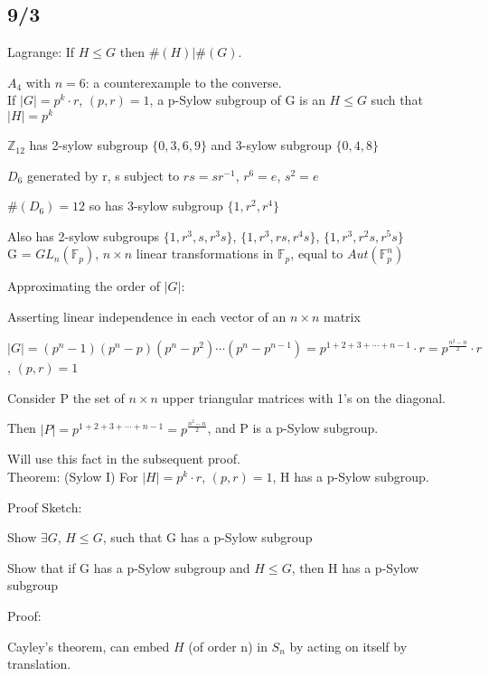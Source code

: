 \documentclass[12pt]{article}
\begin{document}
\subsection{9/3}

\noindent
Lagrange: If $H \leq G$ then $\#(H)|\#(G)$.

$A_4$ with $n = 6$: a counterexample to the converse.\\

\noindent
If $|G| = p^k \cdot r$, $(p, r) = 1$, a p-Sylow subgroup of G is an $H \leq G$ such that $|H| = p^k$

\noindent
$\mathds{Z}_{12}$ has 2-sylow subgroup $\{0, 3, 6, 9\}$ and 3-sylow subgroup $\{0, 4, 8\}$

\noindent
$D_6$ generated by r, s subject to $rs = sr^{-1}$, $r^6 = e$, $s^2 = e$

$\#(D_6) = 12$ so has 3-sylow subgroup $\{1, r^2, r^4\}$

Also has 2-sylow subgroups $\{1, r^3, s, r^3s\}$, $\{1, r^3, rs, r^4s\}$, $\{1, r^3, r^2s, r^5s\}$\\

\noindent
G = $GL_n(\mathds{F}_p)$, $n \times n$ linear transformations in $\mathds{F}_p$, equal to $Aut(\mathds{F}_p^n)$

\noindent
Approximating the order of $|G|$:  

Asserting linear independence in each vector of an $n \times n$ matrix

$|G| = (p^n - 1)(p^n-p)(p^n-p^2)\cdots(p^n-p^{n-1}) = p^{1 + 2 + 3 + \cdots + n - 1}\cdot r = p^{\frac{n^2 - n}{2}} \cdot r$, $(p, r) = 1$

Consider P the set of $n \times n$ upper triangular matrices with 1's on the diagonal.

Then $|P| = p^{1 + 2 + 3 + \cdots + n - 1} = p^{\frac{n^2 - n}{2}}$, and P is a p-Sylow subgroup.

Will use this fact in the subsequent proof.\\

\noindent
Theorem: (Sylow I) For $|H| = p^k \cdot r$, $(p, r) = 1$, H has a p-Sylow subgroup.

\noindent
Proof Sketch:

Show $\exists G$, $H \leq G$, such that G has a p-Sylow subgroup

Show that if G has a p-Sylow subgroup and $H \leq G$, then H has a p-Sylow subgroup

\noindent
Proof:

Cayley's theorem, can embed $H$ (of order n) in $S_n$ by acting on itself by translation.
\end{document}
